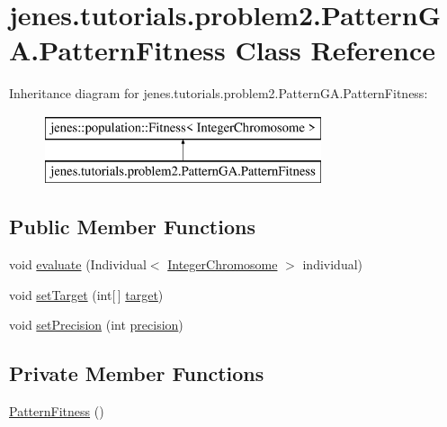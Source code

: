 \hypertarget{classjenes_1_1tutorials_1_1problem2_1_1_pattern_g_a_1_1_pattern_fitness}{\section{jenes.\-tutorials.\-problem2.\-Pattern\-G\-A.\-Pattern\-Fitness Class Reference}
\label{classjenes_1_1tutorials_1_1problem2_1_1_pattern_g_a_1_1_pattern_fitness}
}
Inheritance diagram for jenes.\-tutorials.\-problem2.\-Pattern\-G\-A.\-Pattern\-Fitness\-:\begin{figure}[H]
\begin{center}
\leavevmode
\includegraphics[height=2.000000cm]{classjenes_1_1tutorials_1_1problem2_1_1_pattern_g_a_1_1_pattern_fitness}
\end{center}
\end{figure}
\subsection*{Public Member Functions}
\begin{DoxyCompactItemize}
\item 
void \hyperlink{classjenes_1_1tutorials_1_1problem2_1_1_pattern_g_a_1_1_pattern_fitness_a29d36d1fc46742486419d4959d9d0c4a}{evaluate} (Individual$<$ \hyperlink{classjenes_1_1chromosome_1_1_integer_chromosome}{Integer\-Chromosome} $>$ individual)
\item 
void \hyperlink{classjenes_1_1tutorials_1_1problem2_1_1_pattern_g_a_1_1_pattern_fitness_a2e872fcc0738eb711d5ab5e549ca745b}{set\-Target} (int\mbox{[}$\,$\mbox{]} \hyperlink{classjenes_1_1tutorials_1_1problem2_1_1_pattern_g_a_1_1_pattern_fitness_addb356e69add99f5406d42be813e4091}{target})
\item 
void \hyperlink{classjenes_1_1tutorials_1_1problem2_1_1_pattern_g_a_1_1_pattern_fitness_a19aca4cdfc7c8e33462a15022d4c7a54}{set\-Precision} (int \hyperlink{classjenes_1_1tutorials_1_1problem2_1_1_pattern_g_a_1_1_pattern_fitness_a667e60102d5d681e9358c19e6b059efa}{precision})
\end{DoxyCompactItemize}
\subsection*{Private Member Functions}
\begin{DoxyCompactItemize}
\item 
\hyperlink{classjenes_1_1tutorials_1_1problem2_1_1_pattern_g_a_1_1_pattern_fitness_aec3fa4b725d644bba4c1012e02dd0e24}{Pattern\-Fitness} ()
\end{DoxyCompactItemize}
